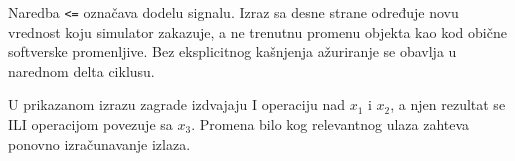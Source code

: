 Naredba \texttt{<=} označava dodelu signalu. Izraz sa desne strane određuje novu vrednost koju simulator zakazuje, a ne trenutnu promenu objekta kao kod obične softverske promenljive. Bez eksplicitnog kašnjenja ažuriranje se obavlja u narednom delta ciklusu.

U prikazanom izrazu zagrade izdvajaju I operaciju nad \(x_1\) i \(x_2\), a njen rezultat se ILI operacijom povezuje sa \(x_3\). Promena bilo kog relevantnog ulaza zahteva ponovno izračunavanje izlaza.
